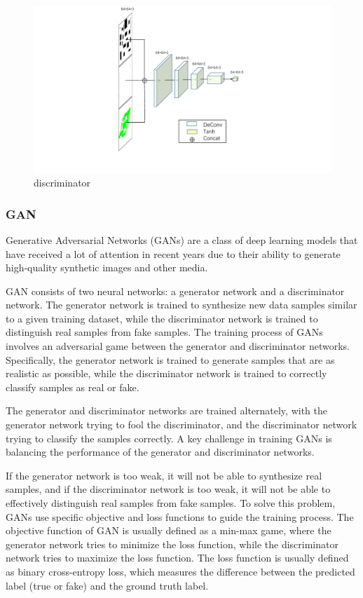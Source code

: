 \documentclass[smallcondensed]{svjour3}     %
\begin{document}
\begin{figure}
\centering
\includegraphics[scale=0.4]{network-CGDiscriminator.pdf}%
\caption{discriminator}     
\label{fig:discriminator}
\end{figure}


\subsubsection{GAN}
Generative Adversarial Networks (GANs) are a class of deep learning models that have received a lot of attention in recent years due to their ability to generate high-quality synthetic images and other media. 

GAN consists of two neural networks: a generator network and a discriminator network. 
The generator network is trained to synthesize new data samples similar to a given training dataset, while the discriminator network is trained to distinguish real samples from fake samples.
The training process of GANs involves an adversarial game between the generator and discriminator networks. 
Specifically, the generator network is trained to generate samples that are as realistic as possible, while the discriminator network is trained to correctly classify samples as real or fake. 

The generator and discriminator networks are trained alternately, with the generator network trying to fool the discriminator, and the discriminator network trying to classify the samples correctly.
A key challenge in training GANs is balancing the performance of the generator and discriminator networks. 

If the generator network is too weak, it will not be able to synthesize real samples, and if the discriminator network is too weak, it will not be able to effectively distinguish real samples from fake samples. 
To solve this problem, GANs use specific objective and loss functions to guide the training process.
The objective function of GAN is usually defined as a min-max game, where the generator network tries to minimize the loss function, while the discriminator network tries to maximize the loss function.
The loss function is usually defined as binary cross-entropy loss, which measures the difference between the predicted label (true or fake) and the ground truth label.
\end{document}
